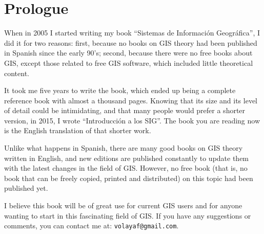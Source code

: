 \chapter*{Prologue}

\vspace{-1cm}

When in 2005 I started writing my book ``Sistemas de Informaci\'{o}n Geogr\'{a}fica'', I did it for two reasons: first, because no books on GIS theory had been published in Spanish since the early 90's; second, because there were no free books about GIS, except those related to free GIS software, which included little theoretical content.

It took me five years to write the book, which ended up being a complete reference book with almost a thousand pages. Knowing that its size and its level of detail could be intimidating, and that many people would prefer a shorter version, in 2015, I wrote ``Introducci\'{o}n a los SIG''. The book you are reading now is the English translation of that shorter work.

Unlike what happens in Spanish, there are many good books on GIS theory written in English, and new editions are published constantly to update them with the latest changes in the field of GIS. However, no free book (that is, no book that can be freely copied, printed and distributed) on this topic had been published yet. 

I believe this book will be of great use for current GIS users and for anyone wanting to start in this fascinating field of GIS. If you have any suggestions or comments, you can contact me at: \texttt{volayaf@gmail.com}.